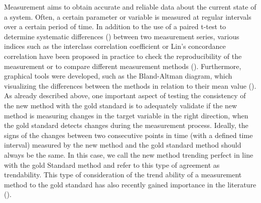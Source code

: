 Measurement aims to obtain accurate and reliable data about the current state of a system. Often, a certain parameter or variable is measured at regular intervals over a certain period of time. In addition to the use of a paired t-test to determine systematic differences (\cite{watson2010method}) between two measurement series, various indices such as the interclass correlation coefficient or Lin's concordance correlation have been proposed in practice to check the reproducibility of the measurement or to compare different measurement methods (\cite{lawrence1989concordance,koo2016guideline}). Furthermore, graphical tools were developed, such as the Bland-Altman diagram, which visualizing the differences between the methods in relation to their mean value (\cite{bland1986statistical}). As already described above, one important aspect of testing the consistency of the new method with the gold standard is to adequately validate if the new method is measuring changes in the target variable in the right direction, when the gold standard detects changes during the measurement process. 
Ideally, the signs of the changes between two consecutive points in time (with a defined time interval) measured by the new method and the gold standard method should always be the same. 
In this case, we call the new method trending perfect in line with the gold Standard method and refer to this type of agreement as trendability. 
This type of consideration of the trend ability of a measurement method to the gold standard has also recently gained importance in the literature (\cite{saugel2015tracking, saugel2018error, hiraishi2021concordance}). 


